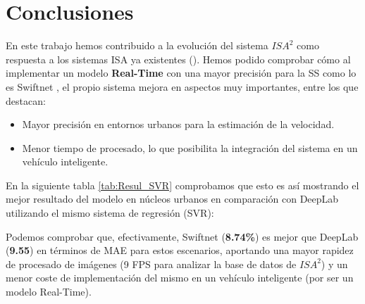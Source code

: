 \chapter{Conclusiones}
\label{ch:conc}

En este trabajo hemos contribuido a la evolución del sistema $ISA^{2}$ como respuesta a los sistemas \ac{ISA} ya existentes (\cite{isa2}). Hemos podido comprobar cómo al implementar un modelo \textbf{Real-Time} con una mayor precisión para la \ac{SS} como lo es Swiftnet \cite{swiftnet}, el propio sistema mejora en aspectos muy importantes, entre los que destacan:

\begin{itemize}
\item Mayor precisión en entornos urbanos para la estimación de la velocidad.
\item Menor tiempo de procesado, lo que posibilita la integración del sistema en un vehículo inteligente.
\end{itemize}


En la siguiente tabla \ref{tab:Resul_SVR} comprobamos que esto es así mostrando el mejor resultado del modelo en núcleos urbanos en comparación con DeepLab utilizando el mismo sistema de regresión (\ac{SVR}): 

\begin{table}[H]
\centering
{}
\caption{Resultados de \ac{SVR}}
\label{tab:Resul_SVR}
\end{table}

Podemos comprobar que, efectivamente, Swiftnet (\textbf{8.74\%}) es mejor que DeepLab (\textbf{9.55}) en términos de \ac{MAE} para estos escenarios, aportando una mayor rapidez de procesado de imágenes (9 \ac{FPS} para analizar la base de datos de $ISA^{2}$) y un menor coste de implementación del mismo en un vehículo inteligente (por ser un modelo Real-Time). 

